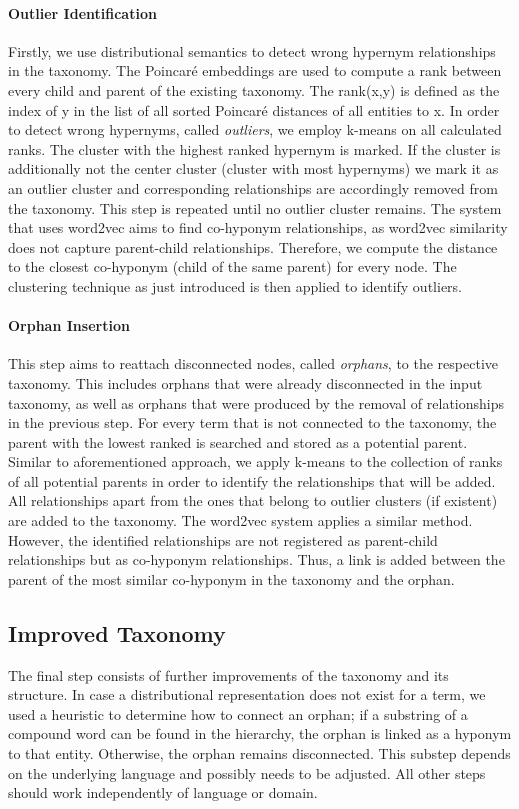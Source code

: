 \documentclass[12pt, headsepline, a4paper]{scrartcl}
\begin{document}
\paragraph{Outlier Identification}
Firstly, we use distributional semantics to detect wrong hypernym relationships in the taxonomy.
The Poincaré embeddings are used to compute a rank between every child and parent of the existing taxonomy. The rank(x,y) is defined as the index of y in the list of all sorted Poincaré distances of all entities to x. In order to detect wrong hypernyms, called \emph{outliers}, we employ k-means on all calculated ranks. The cluster with the highest ranked hypernym is marked. If the cluster is additionally not the center cluster (cluster with most hypernyms) we mark it as an outlier cluster and corresponding relationships are accordingly removed from the taxonomy. This step is repeated until no outlier cluster remains.
The system that uses word2vec aims to find co-hyponym relationships, as word2vec similarity does not capture parent-child relationships. Therefore, we compute the distance to the closest co-hyponym (child of the same parent) for every node. The clustering technique as just introduced is then applied to identify outliers.

\paragraph{Orphan Insertion} 
This step aims to reattach disconnected nodes, called \emph{orphans}, to the respective taxonomy. This includes orphans that were already disconnected in the input taxonomy, as well as orphans that were produced by the removal of relationships in the previous step.
For every term that is not connected to the taxonomy, the parent with the lowest ranked is searched and stored as a potential parent. Similar to aforementioned approach, we apply k-means to the collection of ranks of all potential parents in order to identify the relationships that will be added. All relationships apart from the ones that belong to outlier clusters (if existent) are added to the taxonomy.
The word2vec system applies a similar method. However, the identified relationships are not registered as parent-child relationships but as co-hyponym relationships. Thus, a link is added between the parent of the most similar co-hyponym in the taxonomy and the orphan.

\subsection{Improved Taxonomy}
\label{Improved_Taxonomy}
The final step consists of further improvements of the taxonomy and its structure. In case a distributional representation does not exist for a term, we used a heuristic to determine how to connect an orphan; if a substring of a compound word can be found in the hierarchy, the orphan is linked as a hyponym to that entity. Otherwise, the orphan remains disconnected. This substep depends on the underlying language and possibly needs to be adjusted. All other steps should work independently of language or domain. 
\end{document}
